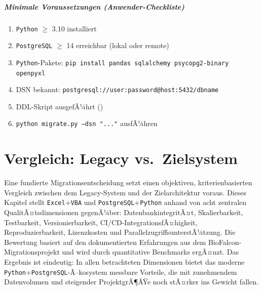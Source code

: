 ﻿\documentclass[12pt,a4paper]{report}
\theoremstyle{definition}
\theoremstyle{remark}
\newcommand{\excel}{\texttt{Excel}}
\newcommand{\vba}{\texttt{VBA}}
\newcommand{\pg}{\texttt{PostgreSQL}}
\newcommand{\py}{\texttt{Python}}
\newcommand{\code}[1]{\texttt{#1}}
\begin{document}
\paragraph{Minimale Voraussetzungen (Anwender-Checkliste)}
\begin{enumerate}[leftmargin=1.5em, topsep=2pt, itemsep=2pt]
  \item \py{} $\geq$ 3.10 installiert
  \item \pg{} $\geq$ 14 erreichbar (lokal oder remote)
  \item \py-Pakete: \code{pip install pandas sqlalchemy psycopg2-binary openpyxl}
  \item DSN bekannt: \code{postgresql://user:password@host:5432/dbname}
  \item DDL-Skript ausgefÃ¼hrt ()
  \item \code{python migrate.py --dsn "..."} ausfÃ¼hren
\end{enumerate}

\chapter{Vergleich: Legacy vs.\ Zielsystem}

Eine fundierte Migrationsentscheidung setzt einen objektiven, kriterienbasierten Vergleich zwischen dem Legacy-System und der Zielarchitektur voraus. Dieses Kapitel stellt \excel{}+\vba{} und \pg{}+\py{} anhand von acht zentralen QualitÃ¤tsdimensionen gegenÃ¼ber: DatenbankintegritÃ¤t, Skalierbarkeit, Testbarkeit, Versionierbarkeit, CI/CD-IntegrationsfÃ¤higkeit, Reproduzierbarkeit, Lizenzkosten und ParallelzugriffsunterstÃ¼tzung. Die Bewertung basiert auf den dokumentierten Erfahrungen aus dem BioFalcon-Migrations\-projekt und wird durch quantitative Benchmarks ergÃ¤nzt. Das Ergebnis ist eindeutig: In allen betrachteten Dimensionen bietet das moderne \py{}+\pg{}-Ã–kosystem messbare Vorteile, die mit zunehmendem Datenvolumen und steigender ProjektgrÃ¶ÃŸe noch stÃ¤rker ins Gewicht fallen.
\end{document}
